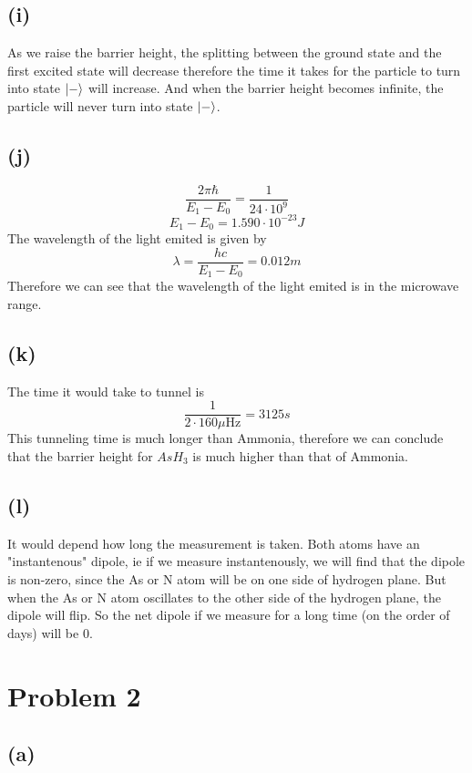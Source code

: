 \documentclass[11pt]{article}
\begin{document}
\subsection*{(i)}
As we raise the barrier height, the splitting between the ground state and 
the first excited state will decrease therefore 
the time it takes for the particle to turn into state $\ket{-}$ will increase. And when 
the barrier height becomes infinite, the particle will never turn into state $\ket{-}$. 
\subsection*{(j)}
$$\frac{2\pi\hbar}{E_1-E_0} = \frac{1}{24\cdot10^9}$$
$$E_1-E_0 = 1.590\cdot 10^{-23}J$$
The wavelength of the light emited is given by 
$$\lambda = \frac{hc}{E_1-E_0} = 0.012m$$
Therefore we can see that the wavelength of the light emited is in the
microwave range. 
\subsection*{(k)}
The time it would take to tunnel is 
$$\frac{1}{2\cdot 160\mu \text{Hz}} = 3125s$$
This tunneling time is much longer than Ammonia, therefore we can conclude 
that the barrier height for $AsH_3$ is much higher than that of Ammonia.
\subsection*{(l)}
It would depend how long the measurement is taken. Both atoms have an "instantenous" dipole,
ie if we measure instantenously, we will find that the dipole is non-zero, since the 
As or N atom will be on one side of hydrogen plane. But when
the As or N atom oscillates to the other side of the hydrogen plane, the dipole will flip.
So the net dipole if we measure for a long time (on the order of days) will be $0$.
\section*{Problem 2}
\subsection*{(a)}
\end{document}
